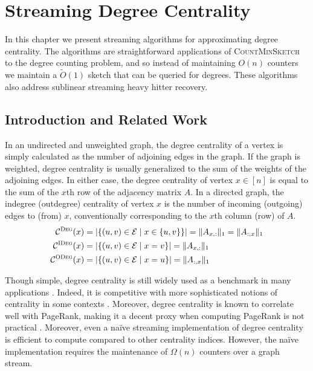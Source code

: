 \documentclass{report}
\newcommand{\algoname}[1]{\textnormal{\textsc{#1}}}
\begin{document}
\chapter{Streaming Degree Centrality} \label{chap:dc}

In this chapter we present streaming algorithms for approximating degree centrality.
The algorithms are straightforward applications of \algoname{CountMinSketch} to the degree counting problem, and so instead of maintaining $O(n)$ counters we maintain a $\widetilde{O}(1)$ sketch that can be queried for degrees.
These algorithms also address sublinear streaming heavy hitter recovery.

\section{Introduction and Related Work} \label{dc:sec:intro}

In an undirected and unweighted graph, the degree centrality of a vertex is simply calculated as the number of adjoining edges in the graph.
If the graph is weighted, degree centrality is usually generalized to the sum of the weights of the adjoining edges. 
In either case, the degree centrality of  vertex $x \in [n]$ is equal to the sum of the $x$th row of the adjacency matrix $A$.
In a directed graph, the indegree (outdegree) centrality of vertex $x$ is the number of incoming (outgoing) edges to (from) $x$, conventionally corresponding to the $x$th column (row) of $A$.
%
\begin{align} 
\label{eq:dc}
\mathcal{C}^{\algoname{Deg}}(x) 
&= |\{(u,v) \in \mathcal{E} \mid x \in \{u,v\} \}| 
= \| A_{x,:} \|_1 
= \| A_{:,x} \|_1 \\
\label{eq:idc}
\mathcal{C}^{\algoname{IDeg}}(x) 
&= |\{(u,v) \in \mathcal{E} \mid x =v \}| 
= \| A_{x,:} \|_1 \\
\label{eq:odc}
\mathcal{C}^{\algoname{ODeg}}(x) 
&= |\{(u,v) \in \mathcal{E} \mid x =u \}|
= \| A_{:,x} \|_1
\end{align}
%


Though simple, degree centrality is still widely used as a benchmark in many applications \cite{boldi2014axioms}. 
Indeed, it is competitive with more sophisticated notions of centrality in some contexts \cite{upstill2003predicting}.
Moreover, degree centrality is known to correlate well with PageRank, making it a decent proxy when computing PageRank is not practical \cite{upstill2003predicting}.
Moreover, even a na\"ive streaming implementation of degree centrality is efficient to compute compared to other centrality indices.
However, the na\"ive implementation requires the maintenance of $\Omega(n)$ counters over a graph stream. 
\end{document}
